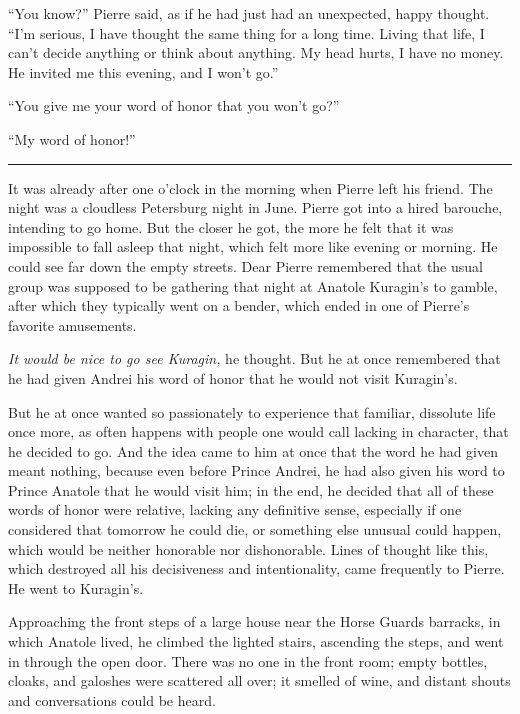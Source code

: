 ``You know?'' Pierre said, as if he had just had an unexpected, happy thought. ``I'm serious, I have thought the same thing for a long time. Living that life, I can't decide anything or think about anything. My head hurts, I have no money. He invited me this evening, and I won't go.'' %

``You give me your word of honor that you won't go?'' %

``My word of honor!'' %

\begin{center}
	\rule{5em}{0.4pt}
\end{center}

It was already after one o'clock in the morning when Pierre left his friend. The night was a cloudless Petersburg night in June. Pierre got into a hired barouche, intending to go home. But the closer he got, the more he felt that it was impossible to fall asleep that night, which felt more like evening or morning. He could see far down the empty streets. Dear Pierre remembered that the usual group was supposed to be gathering that night at Anatole Kuragin's to gamble, after which they typically went on a bender, which ended in one of Pierre's favorite amusements.

\textit{It would be nice to go see Kuragin,} he thought. But he at once remembered that he had given Andrei his word of honor that he would not visit Kuragin's.

But he at once wanted so passionately to experience that familiar, dissolute life once more, as often happens with people one would call lacking in character, that he decided to go. And the idea came to him at once that the word he had given meant nothing, because even before Prince Andrei, he had also given his word to Prince Anatole that he would visit him; in the end, he decided that all of these words of honor were relative, lacking any definitive sense, especially if one considered that tomorrow he could die, or something else unusual could happen, which would be neither honorable nor dishonorable. Lines of thought like this, which destroyed all his decisiveness and intentionality, came frequently to Pierre. He went to Kuragin's.

Approaching the front steps of a large house near the Horse Guards barracks, in which Anatole lived, he climbed the lighted stairs, ascending the steps, and went in through the open door. There was no one in the front room; empty bottles, cloaks, and galoshes were scattered all over; it smelled of wine, and distant shouts and conversations could be heard.

